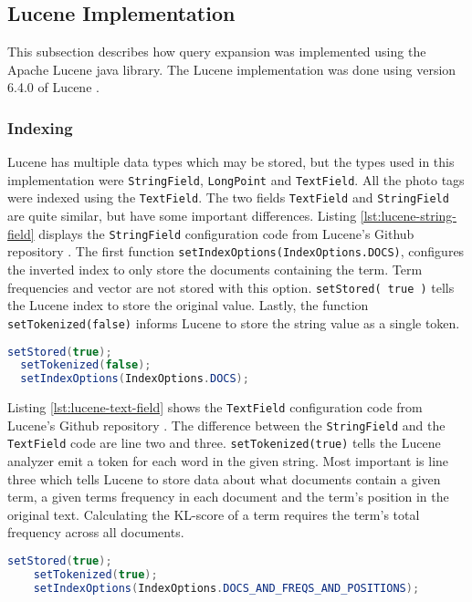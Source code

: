 \subsection{Lucene Implementation}
\label{sec:lucene}
This subsection describes how query expansion was implemented using the Apache Lucene java library.
The Lucene implementation was done using version 6.4.0 of Lucene \cite{lucene-documentation}.

\subsubsection{Indexing}
Lucene has multiple data types which may be stored,
but the types used in this implementation were \texttt{StringField}, \texttt{LongPoint} and \texttt{TextField}.
All the photo tags were indexed using the \texttt{TextField}.
The two fields \texttt{TextField} and \texttt{StringField} are quite similar,
but have some important differences.
Listing \ref{lst:lucene-string-field} displays the \texttt{StringField} configuration code from Lucene's Github repository \cite{lucene-stringfield}.
The first function \texttt{setIndexOptions(IndexOptions.DOCS)},
configures the inverted index to only store the documents containing the term.
Term frequencies and vector are not stored with this option.
\texttt{setStored( true )} tells the Lucene index to store the original value.
Lastly, the function \texttt{setTokenized(false)} informs Lucene to store the string value as a single token.

\begin{lstlisting}[language=java, caption={Lucene's \texttt{StringField} index configuration.}, label={lst:lucene-string-field}]
  setStored(true);
  setTokenized(false);
  setIndexOptions(IndexOptions.DOCS);
\end{lstlisting}

Listing \ref{lst:lucene-text-field} shows the \texttt{TextField} configuration code from Lucene's Github repository \cite{lucene-textfield}.
The difference between the \texttt{StringField} and the \texttt{TextField} code are line two and three.
\texttt{setTokenized(true)} tells the Lucene analyzer emit a token for each word in the given string.
Most important is line three which tells Lucene to store data about what documents contain a given term,
a given terms frequency in each document and the term's position in the original text.
Calculating the KL-score of a term requires the term's total frequency across all documents.

\begin{lstlisting}[language=java, caption={Lucene's \texttt{TextField} index configuration.}, label={lst:lucene-text-field}]
    setStored(true);
    setTokenized(true);
    setIndexOptions(IndexOptions.DOCS_AND_FREQS_AND_POSITIONS);
\end{lstlisting}

